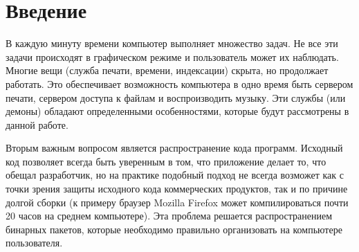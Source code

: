\section*{Введение}

В каждую минуту времени компьютер выполняет множество задач. Не все эти задачи происходят в графическом режиме и пользователь может их наблюдать. Многие вещи (служба печати, времени, индексации) скрыта, но продолжает работать. Это обеспечивает возможность компьютера в одно время быть сервером печати, сервером доступа к файлам и воспроизводить музыку. Эти службы (или демоны) обладают определенными особенностями, которые будут рассмотрены в данной работе.

Вторым важным вопросом является распространение кода программ. Исходный код позволяет всегда быть уверенным в том, что приложение делает то, что обещал разработчик, но на практике подобный подход не всегда возможет как с точки зрения защиты исходного кода коммерческих продуктов, так и по причине долгой сборки (к примеру браузер Mozilla Firefox может компилироваться почти 20 часов на среднем компьютере). Эта проблема решается распространением бинарных пакетов, которые необходимо правильно организовать на компьютере пользователя.